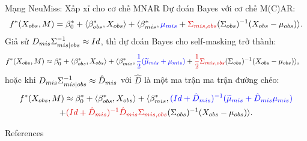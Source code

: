 \documentclass[aspectratio=169, 10pt]{beamer} %
\begin{document}
\begin{frame}{Mạng NeuMiss: Xấp xỉ cho cơ chế MNAR}
    Dự đoán Bayes với cơ chế M(C)AR:
    \[
        f^* (X_{obs},M ) =
        \beta_{0}^{*} + \langle\beta_{obs}^{*},X_{obs} \rangle+\langle\beta_{mis}^{*},\textcolor{blue}{\mu_{mis}} + \textcolor{red}{\cov_{mis,obs}} {(\cov_{obs})^{-1}}(X_{obs}-\mu_{obs})\rangle.
    \]
    Giả sử $D_{mis} \Sigma_{mis|obs}^{-1} \approx Id$, thì dự đoán Bayes cho self-masking trở thành:
    \begin{align*}
        f^*(X_{obs}, M) 
        &\approx \beta_0^* + \langle \beta_{obs}^*, X_{obs}\rangle + \langle \beta_{mis}^*, \textcolor{blue}{\frac{1}{2} (\widetilde{\mu}_{mis} + \mu_{mis})} + \textcolor{red}{\frac{1}{2}  \cov_{mis,obs}} (\cov_{obs})^{-1} (X_{obs} - \mu_{obs}) \rangle,
    \end{align*}
    hoặc khi $D_{mis} \Sigma_{mis|obs}^{-1} \approx \hat{D}_{mis}$ với $\hat{D}$ là một ma trận ma trận đường chéo:
    \begin{multline*}
        f^*(X_{obs}, M) 
        \approx \beta_0^* + \langle \beta_{obs}^*, X_{obs}\rangle + \langle \beta_{mis}^*, 
        \textcolor{blue}{(Id + \hat{D}_{mis})^{-1} (\widetilde{\mu}_{mis} + \hat{D}_{mis} \mu_{mis})} \\
        + \textcolor{red}{(Id + \hat{D}_{mis})^{-1} \hat{D}_{mis} \cov_{mis,obs}} (\cov_{obs})^{-1} (X_{obs} - \mu_{obs}) \rangle.
    \end{multline*}
\end{frame}





\begin{frame}[allowframebreaks]{References}
    \printbibliography
\end{frame}

\begin{frame}[plain]
\end{frame}
\end{document}
